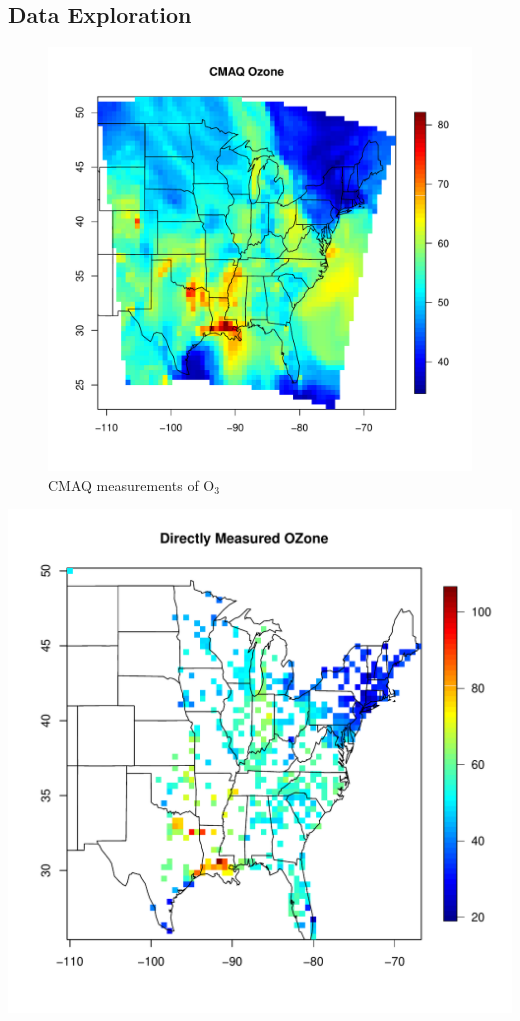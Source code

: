 \documentclass{article}                                                   %
\begin{document}
  \subsection{Data Exploration}
    \begin{figure}\begin{center}
      \caption{CMAQ measurements of O$_3$}
      \includegraphics{raw/cmaq.pdf}
    \end{center}\end{figure}

    \includegraphics{raw/ozone.pdf}
\end{document}
